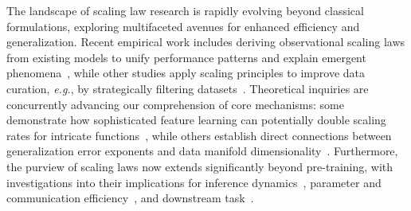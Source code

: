 \documentclass{article}
\newcommand{\eg}{{\emph{e.g.}}, }
\begin{document}
The landscape of scaling law research is rapidly evolving beyond classical formulations, exploring multifaceted avenues for enhanced efficiency and generalization. 
Recent empirical work includes deriving observational scaling laws from existing models to unify performance patterns and explain emergent phenomena~\cite{ruan2024obs,bahri2024explaining,havrilla2024understanding,wang2023data}, while other studies apply scaling principles to improve data curation, \eg by strategically filtering datasets~\cite{li2024scalingfilter,li2024mis,sharma2022scaling,michaud2023quantization,yang2025scaling,fang2024scaling}.
Theoretical inquiries are concurrently advancing our comprehension of core mechanisms: some demonstrate how sophisticated feature learning can potentially double scaling rates for intricate functions~\cite{bordelon2024feature}, while others establish direct connections between generalization error exponents and data manifold dimensionality~\cite{havrilla2024understanding}. 
Furthermore, the purview of scaling laws now extends significantly beyond pre-training, with investigations into their implications for inference dynamics~\cite{wu2025inference,xu2025unveiling,levi2024simple,wu2025inference,10.5555/3692070.3693840}, parameter and communication efficiency~\cite{abnar2025parameters,charles2025communication}, and downstream task~\cite{isik2024scaling,chen2024scaling,xu2025unveiling,hernandez2021scaling,shin2023scaling,cherti2023reproducible,diaz2024scaling,sorscher2022beyond,su2024unraveling,liu2024scaling,kumar2024scaling}. 



 

\end{document}
